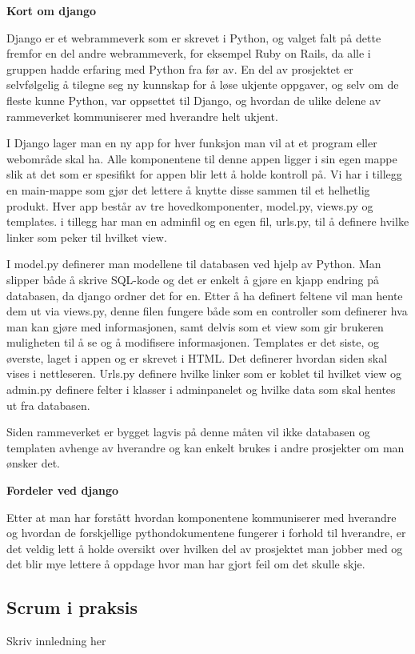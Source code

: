 \documentclass[12pt,a4paper,norsk]{article}
\begin{document}
\bigskip \noindent \textbf{Kort om django}
\par Django er et webrammeverk som er skrevet i Python, og valget falt på dette fremfor en del andre webrammeverk, for eksempel Ruby on Rails, da alle i gruppen hadde erfaring med Python fra før av. En del av prosjektet er selvfølgelig å tilegne seg ny kunnskap for å løse ukjente oppgaver, og selv om de fleste kunne Python, var oppsettet til Django, og hvordan de ulike delene av rammeverket kommuniserer med hverandre helt ukjent.

I Django lager man en ny app for hver funksjon man vil at et program eller webområde skal ha. Alle komponentene til denne appen ligger i sin egen mappe slik at det som er spesifikt for appen blir lett å holde kontroll på. Vi har i tillegg en main-mappe som gjør det lettere å knytte disse sammen til et helhetlig produkt. Hver app består av tre hovedkomponenter, model.py, views.py og templates. i tillegg har man en adminfil og en egen fil, urls.py, til å definere hvilke linker som peker til hvilket view.

I model.py definerer man modellene til databasen ved hjelp av Python. Man slipper både å skrive SQL-kode og det er enkelt å gjøre en kjapp endring på databasen, da django ordner det for en. Etter å ha definert feltene vil man hente dem ut via views.py, denne filen fungere både som en controller som definerer hva man kan gjøre med informasjonen, samt delvis som et view som gir brukeren muligheten til å se og å modifisere informasjonen. Templates er det siste, og øverste, laget i appen og er skrevet i HTML. Det definerer hvordan siden skal vises i nettleseren. Urls.py definere hvilke linker som er koblet til hvilket view og admin.py definere felter i klasser i adminpanelet og hvilke data som skal hentes ut fra databasen.

Siden rammeverket er bygget lagvis på denne måten vil ikke databasen og templaten avhenge av hverandre og kan enkelt brukes i andre prosjekter om man ønsker det. 

\bigskip \noindent \textbf{Fordeler ved django}
\par Etter at man har forstått hvordan komponentene kommuniserer med hverandre og hvordan de forskjellige pythondokumentene fungerer i forhold til hverandre, er det veldig lett å holde oversikt over hvilken del av prosjektet man jobber med og det blir mye lettere å oppdage hvor man har gjort feil om det skulle skje.

	\subsection{Scrum i praksis}
	Skriv innledning her
	
\end{document}
